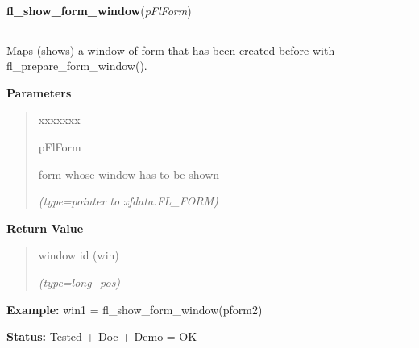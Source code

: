 \hspace{.8\funcindent}\begin{boxedminipage}{\funcwidth}

    \raggedright \textbf{fl\_show\_form\_window}(\textit{pFlForm})

    \vspace{-1.5ex}

    \rule{\textwidth}{0.5\fboxrule}
\setlength{\parskip}{2ex}
    Maps (shows) a window of form that has been created before with 
    fl\_prepare\_form\_window().

\setlength{\parskip}{1ex}
      \textbf{Parameters}
      \vspace{-1ex}

      \begin{quote}
        \begin{Ventry}{xxxxxxx}

          \item[pFlForm]

          form whose window has to be shown

            {\it (type=pointer to xfdata.FL\_FORM)}

        \end{Ventry}

      \end{quote}

      \textbf{Return Value}
    \vspace{-1ex}

      \begin{quote}
      window id (win)

      {\it (type=long\_pos)}

      \end{quote}

\textbf{Example:} win1 = fl\_show\_form\_window(pform2)



\textbf{Status:} Tested + Doc + Demo = OK



    \end{boxedminipage}

    \label{xformslib:flbasic:fl_adjust_form_size}

    \vspace{0.5ex}

